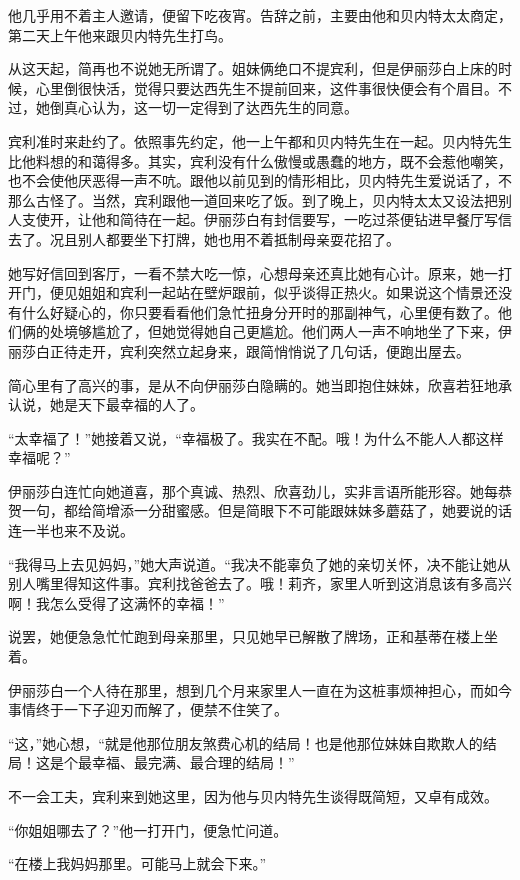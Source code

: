 \par 他几乎用不着主人邀请，便留下吃夜宵。告辞之前，主要由他和贝内特太太商定，第二天上午他来跟贝内特先生打鸟。
\par 从这天起，简再也不说她无所谓了。姐妹俩绝口不提宾利，但是伊丽莎白上床的时候，心里倒很快活，觉得只要达西先生不提前回来，这件事很快便会有个眉目。不过，她倒真心认为，这一切一定得到了达西先生的同意。
\par 宾利准时来赴约了。依照事先约定，他一上午都和贝内特先生在一起。贝内特先生比他料想的和蔼得多。其实，宾利没有什么傲慢或愚蠢的地方，既不会惹他嘲笑，也不会使他厌恶得一声不吭。跟他以前见到的情形相比，贝内特先生爱说话了，不那么古怪了。当然，宾利跟他一道回来吃了饭。到了晚上，贝内特太太又设法把别人支使开，让他和简待在一起。伊丽莎白有封信要写，一吃过茶便钻进早餐厅写信去了。况且别人都要坐下打牌，她也用不着抵制母亲耍花招了。
\par 她写好信回到客厅，一看不禁大吃一惊，心想母亲还真比她有心计。原来，她一打开门，便见姐姐和宾利一起站在壁炉跟前，似乎谈得正热火。如果说这个情景还没有什么好疑心的，你只要看看他们急忙扭身分开时的那副神气，心里便有数了。他们俩的处境够尴尬了，但她觉得她自己更尴尬。他们两人一声不响地坐了下来，伊丽莎白正待走开，宾利突然立起身来，跟简悄悄说了几句话，便跑出屋去。
\par 简心里有了高兴的事，是从不向伊丽莎白隐瞒的。她当即抱住妹妹，欣喜若狂地承认说，她是天下最幸福的人了。
\par “太幸福了！”她接着又说，“幸福极了。我实在不配。哦！为什么不能人人都这样幸福呢？”
\par 伊丽莎白连忙向她道喜，那个真诚、热烈、欣喜劲儿，实非言语所能形容。她每恭贺一句，都给简增添一分甜蜜感。但是简眼下不可能跟妹妹多蘑菇了，她要说的话连一半也来不及说。
\par “我得马上去见妈妈，”她大声说道。“我决不能辜负了她的亲切关怀，决不能让她从别人嘴里得知这件事。宾利找爸爸去了。哦！莉齐，家里人听到这消息该有多高兴啊！我怎么受得了这满怀的幸福！”
\par 说罢，她便急急忙忙跑到母亲那里，只见她早已解散了牌场，正和基蒂在楼上坐着。
\par 伊丽莎白一个人待在那里，想到几个月来家里人一直在为这桩事烦神担心，而如今事情终于一下子迎刃而解了，便禁不住笑了。
\par “这，”她心想，“就是他那位朋友煞费心机的结局！也是他那位妹妹自欺欺人的结局！这是个最幸福、最完满、最合理的结局！”
\par 不一会工夫，宾利来到她这里，因为他与贝内特先生谈得既简短，又卓有成效。
\par “你姐姐哪去了？”他一打开门，便急忙问道。
\par “在楼上我妈妈那里。可能马上就会下来。”
